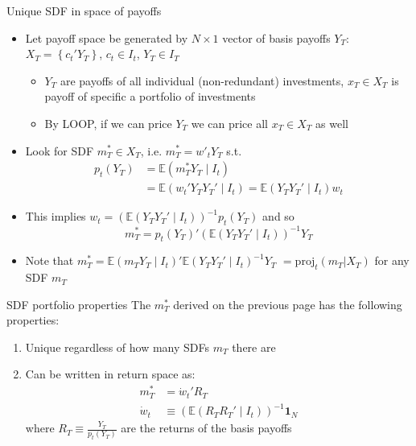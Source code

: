 \documentclass[xcolor=table, aspectratio=169]{beamer}
\begin{document}
\begin{frame}{Unique SDF in space of payoffs}
\begin{itemize}
\item Let payoff space be generated by $N \times 1$ vector of basis payoffs $Y_T$: $X_T = \left\lbrace c_t'Y_T \right\rbrace$, $c_t \in I_t$, $Y_T \in I_T$
\begin{itemize}
\item $Y_T$ are payoffs of all individual (non-redundant) investments, $x_T \in X_T$ is payoff of specific a portfolio of investments
\item By LOOP, if we can price $Y_T$ we can price all $x_T \in X_T$ as well
\end{itemize}
\item Look for SDF $m_T^* \in X_T$, i.e. $m_T^* = w'_t Y_T$ s.t.
\begin{align*}
p_t(Y_T) & = \mathbb{E} \left( m_T^* Y_T \mid I_t \right) \\
&= \mathbb{E} \left( w_t'Y_T Y_T'  \mid I_t \right) =  \mathbb{E} \left( Y_T Y_T' \mid I_t \right) w_t
\end{align*}
\item This implies $w_t = \left( \mathbb{E} \left( Y_T Y_T' \mid I_t \right) \right)^{-1} p_t(Y_T)$ and so
$$m_T^* = p_t(Y_T)' \left( \mathbb{E} \left( Y_T Y_T' \mid I_t \right) \right)^{-1} Y_T$$
\item {\small Note that $m_T^* = \mathbb{E} \left( m_T Y_T \mid I_t \right)' \mathbb{E} \left( Y_T Y_T' \mid I_t \right)^{-1} Y_T$ $= \text{proj}_t(m_T \vert X_T)$ for any SDF $m_T$}
\end{itemize}
\end{frame}

\begin{frame}{SDF portfolio properties}
The $m_T^*$ derived on the previous page has the following properties:
\begin{enumerate}
\item Unique regardless of how many SDFs $m_T$ there are
\item Can be written in return space as:
\begin{align*}
m_T^* &= \dot{w}_t' R_T \\
\dot{w}_t &\equiv \left( \mathbb{E} \left( R_T R_T' \mid I_t \right) \right)^{-1} \mathbf{1}_N
\end{align*}
where $R_T \equiv \frac{Y_T}{p_t(Y_T)}$ are the returns of the basis payoffs
\end{enumerate}
\end{frame}
\end{document}
